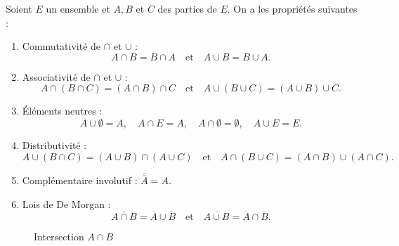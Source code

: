 \begin{prop}[Opérations]
    Soient $E$ un ensemble et $A, B$ et $C$ des parties de $E$. 
    On a les propriétés suivantes : 
    \begin{enumerate}
        \item Commutativité de $\cap$ et $\cup$ : 
            \[ A \cap B = B \cap A \quad \text{et} \quad A \cup B = B \cup A. \] 
        \item Associativité de $\cap$ et $\cup$ :
            \[ A \cap (B \cap C) = (A \cap B) \cap C \quad \text{et} \quad A \cup (B \cup C) = (A \cup B) \cup C. \] 
        \item Éléments neutres : 
            \[ A \cup \emptyset = A, \quad A \cap E = A, \quad A \cap \emptyset = \emptyset, \quad A \cup E = E. \] 
        \item Distributivité : 
            \[ A \cup (B \cap C) = (A \cup B) \cap (A \cup C) \quad \text{et} \quad A \cap (B \cup C) = (A \cap B) \cup (A \cap C). \] 
        \item Complémentaire involutif : $ \overline{\overline{A}} = A$. 
        \item Lois de De Morgan : 
            \[ \overline{A \cap B} = \overline{A} \cup \overline{B} \quad \text{et} \quad \overline{A \cup B} = \overline{A} \cap \overline{B}. \] 
    \end{enumerate}
\end{prop}



\begin{figure}[h!]
\centering
\begin{minipage}{0.45\linewidth}
\centering
{}
\caption{Union $A \cup B$}
\end{minipage}\hfill
\begin{minipage}{0.45\linewidth}
\centering
{}
\caption{Intersection $A \cap B$}
\end{minipage}
\end{figure}


